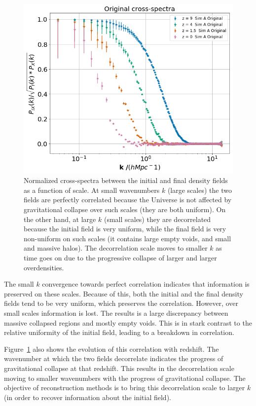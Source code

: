 \begin{figure}
    \centering
    \includegraphics[width=1\columnwidth]{images/perfRecon/orig.png}%
    
    \caption{
    Normalized cross-spectra between the initial and final density fields as a function of scale. At small wavenumbers $k$ (large scales) the two fields are perfectly correlated because the Universe is not affected by gravitational collapse over such scales (they are both uniform). On the other hand, at large $k$ (small scales) they are decorrelated because the initial field is very uniform, while the final field is very non-uniform on such scales (it contains large empty voids, and small and massive halos). The decorrelation scale moves to smaller $k$ as time goes on due to the progressive collapse of larger and larger overdensities.
    }
    
    \label{fig:3.1}
\end{figure}

The small $k$ convergence towards perfect correlation indicates that information is preserved on these scales. Because of this, both the initial and the final density fields tend to be very uniform, which preserves the correlation. However, over small scales information is lost. The results is a large discrepancy between massive collapsed regions and mostly empty voids. This is in stark contrast to the relative uniformity of the initial field, leading to a breakdown in correlation.

Figure~\ref{fig:3.1} also shows the evolution of this correlation with redshift. The wavenumber at which the two fields decorrelate indicates the progress of gravitational collapse at that redshift. This results in the decorrelation scale moving to smaller wavenumbers with the progress of gravitational collapse. The objective of reconstruction methods is to bring this decorrelation scale to larger $k$ (in order to recover information about the initial field).


